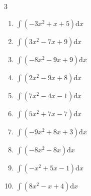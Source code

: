 \begin{multicols}{3}
\begin{enumerate}

\columnbreak %

  \item $\displaystyle \int \left( -3x^{2}+x+5 \right) \mathrm{d}x$


  \item $\displaystyle \int \left( 3x^{2}-7x+9 \right) \mathrm{d}x$


  \item $\displaystyle \int \left( -8x^{2}-9x+9 \right) \mathrm{d}x$


  \item $\displaystyle \int \left( 2x^{2}-9x+8 \right) \mathrm{d}x$


  \item $\displaystyle \int \left( 7x^{2}-4x-1 \right) \mathrm{d}x$


  \item $\displaystyle \int \left( 5x^{2}+7x-7 \right) \mathrm{d}x$


  \item $\displaystyle \int \left( -9x^{2}+8x+3 \right) \mathrm{d}x$


  \item $\displaystyle \int \left( -8x^{2}-8x \right) \mathrm{d}x$


  \item $\displaystyle \int \left( -x^{2}+5x-1 \right) \mathrm{d}x$


  \item $\displaystyle \int \left( 8x^{2}-x+4 \right) \mathrm{d}x$


\end{enumerate}
\end{multicols}
